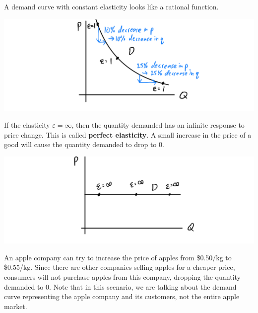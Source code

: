 \documentclass{article}
\begin{document}
      \begin{definition}
        A demand curve with constant elasticity looks like a rational function. 
        \begin{center}
          \includegraphics[scale=0.25]{img/Constant_Elasticity.PNG}
        \end{center}
      \end{definition}

      \begin{definition}
        If the elasticity $\varepsilon = \infty$, then the quantity demanded has an infinite response to price change. This is called \textbf{perfect elasticity}. A small increase in the price of a good will cause the quantity demanded to drop to $0$. 
        \begin{center}
          \includegraphics[scale=0.25]{img/Perfectly_Elastic.PNG}
        \end{center}
        An apple company can try to increase the price of apples from \$0.50/kg to \$0.55/kg. Since there are other companies selling apples for a cheaper price, consumers will not purchase apples from this company, dropping the quantity demanded to $0$. Note that in this scenario, we are talking about the demand curve representing the apple company and its customers, not the entire apple market. 
      \end{definition}
\end{document}
